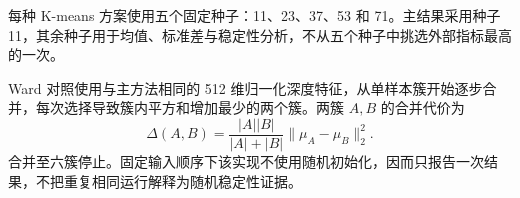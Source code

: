 每种 K-means 方案使用五个固定种子：11、23、37、53 和 71。主结果采用种子 11，其余种子用于均值、标准差与稳定性分析，不从五个种子中挑选外部指标最高的一次。

Ward 对照使用与主方法相同的 512 维归一化深度特征，从单样本簇开始逐步合并，每次选择导致簇内平方和增加最少的两个簇\citep{ward1963}。两簇 $A,B$ 的合并代价为
\begin{equation}
\Delta(A,B)=\frac{|A||B|}{|A|+|B|}
\|\mu_A-\mu_B\|_2^2.
\end{equation}
合并至六簇停止。固定输入顺序下该实现不使用随机初始化，因而只报告一次结果，不把重复相同运行解释为随机稳定性证据。
